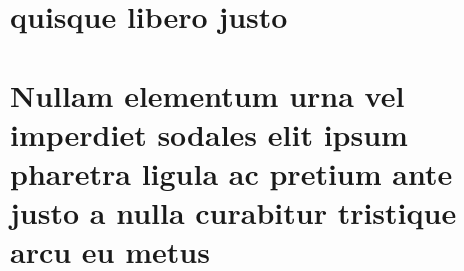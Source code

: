 \begin{apendicesenv}

\partapendices

\chapter{quisque libero justo}


\lipsum[50]

\chapter{Nullam elementum urna vel imperdiet sodales elit ipsum pharetra ligula
ac pretium ante justo a nulla curabitur tristique arcu eu metus}
\lipsum[55-57]

\end{apendicesenv}